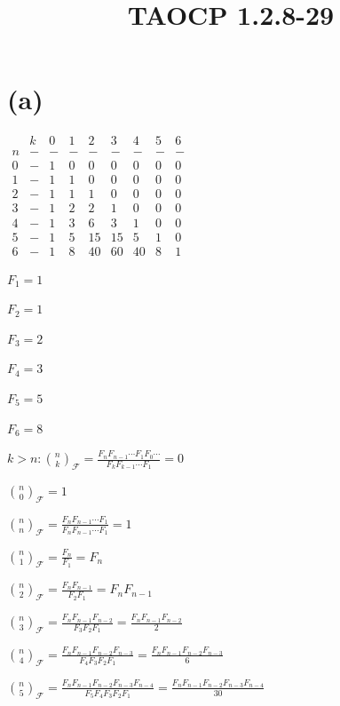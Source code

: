 \documentclass{article}
\title{TAOCP 1.2.8\mbox{-}29}
\begin{document}
\maketitle

\section*{(a)}

\( \begin{matrix} & k & 0 & 1 & 2 & 3 & 4 & 5 & 6 \\ n & - & - & - & - & - & - & - & - \\ 0 & - & 1 & 0 & 0 & 0 & 0 & 0 & 0 \\ 1 & - & 1 & 1 & 0 & 0 & 0 & 0 & 0 \\ 2 & - & 1 & 1 & 1& 0 & 0 & 0 & 0 \\3 & - & 1 & 2 & 2 & 1 & 0 & 0 & 0 \\4 & - & 1 & 3 & 6 & 3 & 1 & 0 & 0 \\ 5 & - & 1 & 5 & 15 & 15 & 5 & 1 & 0 \\ 6 & - & 1 & 8 & 40 & 60 & 40 & 8 & 1 \end{matrix} \)

\( F_{1} = 1 \)

\( F_{2} = 1 \)

\( F_{3} = 2 \)

\( F_{4} = 3 \)

\( F_{5} = 5 \)

\( F_{6} = 8 \)

\( k > n: \binom{n}{k}_{\mathcal{F}} = \frac{F_{n}F_{n-1}\cdots F_{1}F_{0}\cdots}{F_{k}F_{k-1}\cdots F_{1}} = 0 \)

\( \binom{n}{0}_{\mathcal{F}} = 1 \)

\( \binom{n}{n}_{\mathcal{F}} = \frac{F_{n} F_{n-1} \cdots F_{1}}{F_{n} F_{n-1} \cdots F_{1}} = 1 \)

\( \binom{n}{1}_{\mathcal{F}} = \frac{F_{n}}{F_{1}} = F_{n} \)

\( \binom{n}{2}_{\mathcal{F}} = \frac{F_{n}F_{n-1}}{F_{2}F_{1}} = F_{n}F_{n-1} \)

\( \binom{n}{3}_{\mathcal{F}} = \frac{F_{n}F_{n-1}F_{n-2}}{F_{3}F_{2}F_{1}} = \frac{F_{n}F_{n-1}F_{n-2}}{2} \)

\( \binom{n}{4}_{\mathcal{F}} = \frac{F_{n}F_{n-1}F_{n-2}F_{n-3}}{F_{4}F_{3}F_{2}F_{1}} = \frac{F_{n}F_{n-1}F_{n-2}F_{n-3}}{6} \)

\( \binom{n}{5}_{\mathcal{F}} = \frac{F_{n}F_{n-1}F_{n-2}F_{n-3}F_{n-4}}{F_{5}F_{4}F_{3}F_{2}F_{1}} = \frac{F_{n}F_{n-1}F_{n-2}F_{n-3}F_{n-4}}{30} \)
\end{document}
